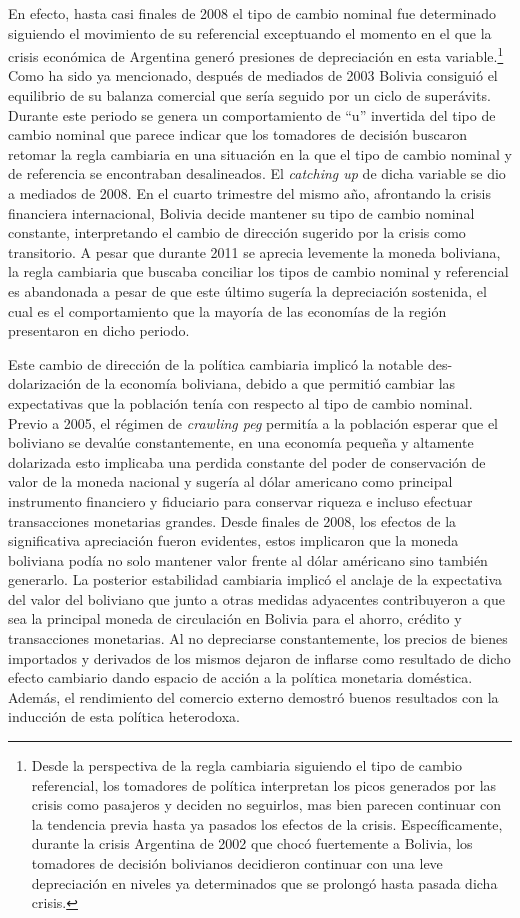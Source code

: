 \documentclass[12pt,letterpaper]{article}
\begin{document}
En efecto, hasta casi finales de 2008 el tipo de cambio nominal fue determinado siguiendo el movimiento de su referencial exceptuando el momento en el que la crisis económica de Argentina generó presiones de depreciación en esta variable.\footnote{Desde la perspectiva de la regla cambiaria siguiendo el tipo de cambio referencial, los tomadores de política interpretan los picos generados por las crisis como pasajeros y deciden no seguirlos, mas bien parecen continuar con la tendencia previa hasta ya pasados los efectos de la crisis. Específicamente, durante la crisis Argentina de 2002 que chocó fuertemente a Bolivia, los tomadores de decisión bolivianos decidieron continuar con una leve depreciación en niveles ya determinados que se prolongó hasta pasada dicha crisis.} Como ha sido ya mencionado, después de mediados de 2003 Bolivia consiguió el equilibrio de su balanza comercial que sería seguido por un ciclo de superávits. Durante este periodo se genera un comportamiento de ``u'' invertida del tipo de cambio nominal que parece indicar que los tomadores de decisión buscaron retomar la regla cambiaria en una situación en la que el tipo de cambio nominal y de referencia se encontraban desalineados. El \emph{catching up} de dicha variable se dio a mediados de 2008. En el cuarto trimestre del mismo año, afrontando la crisis financiera internacional, Bolivia decide mantener su tipo de cambio nominal constante, interpretando el cambio de dirección sugerido por la crisis como transitorio. A pesar que durante 2011 se aprecia levemente la moneda boliviana, la regla cambiaria que buscaba conciliar los tipos de cambio nominal y referencial es abandonada a pesar de que este último sugería la depreciación sostenida, el cual es el comportamiento que la mayoría de las economías de la región presentaron en dicho periodo.

Este cambio de dirección de la política cambiaria implicó la notable des-dolarización de la economía boliviana, debido a que permitió cambiar las expectativas que la población tenía con respecto al tipo de cambio nominal. Previo a 2005, el régimen de \emph{crawling peg} permitía a la población esperar que el boliviano se devalúe constantemente, en una economía pequeña y altamente dolarizada esto implicaba una perdida constante del poder de conservación de valor de la moneda nacional y sugería al dólar americano como principal instrumento financiero y fiduciario para conservar riqueza e incluso efectuar transacciones monetarias grandes. Desde finales de 2008, los efectos de la significativa apreciación fueron evidentes, estos implicaron que la moneda boliviana podía no solo mantener valor frente al dólar américano sino también generarlo. La posterior estabilidad cambiaria implicó el anclaje de la expectativa del valor del boliviano que junto a otras medidas adyacentes contribuyeron a que sea la principal moneda de circulación en Bolivia para el ahorro, crédito y transacciones monetarias. Al no depreciarse constantemente, los precios de bienes importados y derivados de los mismos dejaron de inflarse como resultado de dicho efecto cambiario dando espacio de acción a la política monetaria doméstica. Además, el rendimiento del comercio externo demostró buenos resultados con la inducción de esta política heterodoxa.
\end{document}

